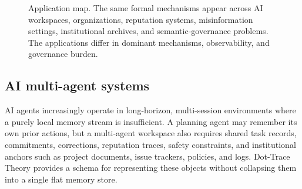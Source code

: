\documentclass[11pt]{article}
\theoremstyle{remark}
\begin{document}
\begin{figure}[htbp]
\centering
{}
\caption{Application map. The same formal mechanisms appear across AI workspaces, organizations, reputation systems, misinformation settings, institutional archives, and semantic-governance problems. The applications differ in dominant mechanisms, observability, and governance burden.}
\label{fig:application-map}
\end{figure}

\subsection{AI multi-agent systems}\label{ai-multi-agent-systems}

AI agents increasingly operate in long-horizon, multi-session environments where a purely local memory stream is insufficient. A planning agent may remember its own prior actions, but a multi-agent workspace also requires shared task records, commitments, corrections, reputation traces, safety constraints, and institutional anchors such as project documents, issue trackers, policies, and logs. Dot-Trace Theory provides a schema for representing these objects without collapsing them into a single flat memory store.
\end{document}
